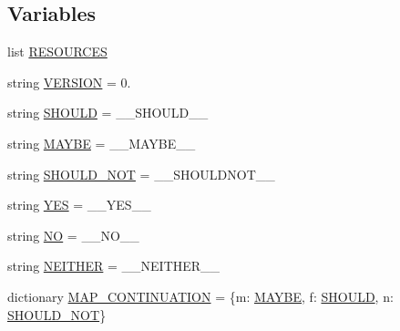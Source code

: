 \subsection*{Variables}
\begin{DoxyCompactItemize}
\item 
list \hyperlink{namespaceparlai_1_1tasks_1_1quac_1_1build_abf5a1571ea64d0a10f2e2657893802da}{R\+E\+S\+O\+U\+R\+C\+ES}
\item 
string \hyperlink{namespaceparlai_1_1tasks_1_1quac_1_1build_a15040270592a75c3a0a6befc607eda9f}{V\+E\+R\+S\+I\+ON} = \textquotesingle{}0.\textquotesingle{}
\item 
string \hyperlink{namespaceparlai_1_1tasks_1_1quac_1_1build_a5f8e1b371211c16c440b76b8ae3f3af6}{S\+H\+O\+U\+LD} = \textquotesingle{}\+\_\+\+\_\+\+S\+H\+O\+U\+L\+D\+\_\+\+\_\+\textquotesingle{}
\item 
string \hyperlink{namespaceparlai_1_1tasks_1_1quac_1_1build_a0591761190bee9bc4e39f88d0f374e86}{M\+A\+Y\+BE} = \textquotesingle{}\+\_\+\+\_\+\+M\+A\+Y\+B\+E\+\_\+\+\_\+\textquotesingle{}
\item 
string \hyperlink{namespaceparlai_1_1tasks_1_1quac_1_1build_af323f9b5375de6cea2bca8b24615a464}{S\+H\+O\+U\+L\+D\+\_\+\+N\+OT} = \textquotesingle{}\+\_\+\+\_\+\+S\+H\+O\+U\+L\+D\+N\+O\+T\+\_\+\+\_\+\textquotesingle{}
\item 
string \hyperlink{namespaceparlai_1_1tasks_1_1quac_1_1build_ae765b76a84d02581f82b38b996795052}{Y\+ES} = \textquotesingle{}\+\_\+\+\_\+\+Y\+E\+S\+\_\+\+\_\+\textquotesingle{}
\item 
string \hyperlink{namespaceparlai_1_1tasks_1_1quac_1_1build_a50beb08d880b27c076327f5a0a26d2e5}{NO} = \textquotesingle{}\+\_\+\+\_\+\+N\+O\+\_\+\+\_\+\textquotesingle{}
\item 
string \hyperlink{namespaceparlai_1_1tasks_1_1quac_1_1build_aea3d40b1bffbd55955c5d462803932c1}{N\+E\+I\+T\+H\+ER} = \textquotesingle{}\+\_\+\+\_\+\+N\+E\+I\+T\+H\+E\+R\+\_\+\+\_\+\textquotesingle{}
\item 
dictionary \hyperlink{namespaceparlai_1_1tasks_1_1quac_1_1build_a4c0429a20d4b3f822b92a2897131ee2d}{M\+A\+P\+\_\+\+C\+O\+N\+T\+I\+N\+U\+A\+T\+I\+ON} = \{\textquotesingle{}m\textquotesingle{}\+: \hyperlink{namespaceparlai_1_1tasks_1_1quac_1_1build_a0591761190bee9bc4e39f88d0f374e86}{M\+A\+Y\+BE}, \textquotesingle{}f\textquotesingle{}\+: \hyperlink{namespaceparlai_1_1tasks_1_1quac_1_1build_a5f8e1b371211c16c440b76b8ae3f3af6}{S\+H\+O\+U\+LD}, \textquotesingle{}n\textquotesingle{}\+: \hyperlink{namespaceparlai_1_1tasks_1_1quac_1_1build_af323f9b5375de6cea2bca8b24615a464}{S\+H\+O\+U\+L\+D\+\_\+\+N\+OT}\}

\end{DoxyCompactItemize}
